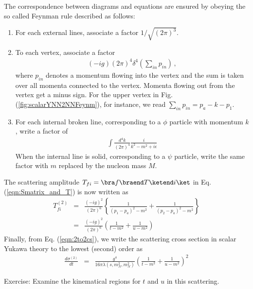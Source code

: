 The correspondence between diagrams and equations are ensured by obeying
the so called Feynman rule described as follows:

\begin{enumerate}
\item For each external lines, associate a factor $1/\sqrt{(2\pi)^3}$.

\item To each vertex, associate a factor
\begin{eqnarray}
(-ig) (2\pi)^4 \delta^4(\sum_{in} p_{in})\,,
\end{eqnarray}
where $p_{in}$ denotes a momentum flowing into the vertex and the sum is taken
over all momenta connected to the vertex. Momenta flowing out from the vertex get
a minus sign. For the upper vertex in Fig. (\ref{fig:scalarYNN2NNFeynm}), for instance,
we read $\sum_{in} p_{in} = p_a - k - p_1$.

\item For each internal broken line, corresponding to a $\phi$ particle with momentum $k$,
write a factor of
\begin{eqnarray}
\int \frac{d^4 k}{(2\pi)^4} \frac{i}{k^2 - m^2 + i\epsilon}
\end{eqnarray}
When the internal line is solid, corresponding to a $\psi$ particle, write the same factor
with $m$ replaced by the nucleon mass $M$.
\end{enumerate}

The scattering amplitude $T_{fi} = \bra f \braend T \ketend i \ket$ 
in Eq. (\ref{eqn:Smatrix_and_T}) is now
written as
\begin{eqnarray}
T_{fi}^{(2)}
&=&
\frac{(-i g)^2}{(2\pi)^6} 
\left\{
\frac{1}{(p_1 - p_a)^2 - m^2}
+
\frac{1}{(p_2 - p_a)^2 - m^2}
\right\}
\nonumber\\
&=&
\frac{(-i g)^2}{(2\pi)^6} 
\left(
\frac{1}{t - m^2}
+
\frac{1}{u - m^2}
\right)
\end{eqnarray}
Finally, from Eq. (\ref{eqn:2to2cs}), we write the scattering cross section 
in scalar Yukawa theory to the lowest (second) order as
\begin{eqnarray}
\frac{d \sigma^{(2)}}{dt}
&=&
\frac{g^4}{16\pi \lambda(s, m_N^2,m_N^2)}
\left(
\frac{1}{t - m^2} + \frac{1}{u - m^2}
\right)^2
\label{eqn:scYNN2NNcs}
\end{eqnarray}

\bigskip

\noindent
{}
Exercise\theexercise:
Examine the kinematical regions for $t$ and $u$ in this scattering.

